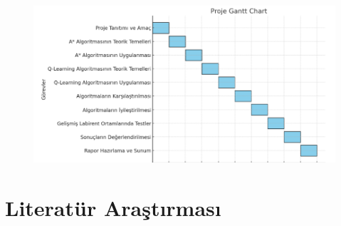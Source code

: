 \documentclass[12pt, a4paper]{article}
\begin{document}
\begin{landscape}
	\begin{figure}[!ht]	
		
			\caption[]{}
		\centering 
		
		\includegraphics[height= 5 cm]{-gantt-chart.png}

		

			\end{figure}

	\end{landscape}	
	
	\section{Literatür Araştırması}	
	
\end{document}
